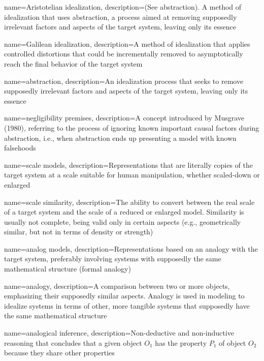 {
    name=Aristotelian idealization,
    description={(See abstraction). A method of idealization that uses abstraction, a process aimed at removing supposedly irrelevant factors and aspects of the target system, leaving only its essence}
}

{
    name=Galilean idealization,
    description={A method of idealization that applies controlled distortions that could be incrementally removed to asymptotically reach the final behavior of the target system}
}

{
    name=abstraction,
    description={An idealization process that seeks to remove supposedly irrelevant factors and aspects of the target system, leaving only its essence}
}

{
    name=negligibility premises,
    description={A concept introduced by Musgrave (1980), referring to the process of ignoring known important causal factors during abstraction, i.e., when abstraction ends up presenting a model with known falsehoods}
}

{
    name=scale models,
    description={Representations that are literally copies of the target system at a scale suitable for human manipulation, whether scaled-down or enlarged}
}

{
    name=scale similarity,
    description={The ability to convert between the real scale of a target system and the scale of a reduced or enlarged model. Similarity is usually not complete, being valid only in certain aspects (e.g., geometrically similar, but not in terms of density or strength)}
}

{
    name=analog models,
    description={Representations based on an analogy with the target system, preferably involving systems with supposedly the same mathematical structure (formal analogy)}
}

{
    name=analogy,
    description={A comparison between two or more objects, emphasizing their supposedly similar aspects. Analogy is used in modeling to idealize systems in terms of other, more tangible systems that supposedly have the same mathematical structure}
}

{
    name=analogical inference,
    description={Non-deductive and non-inductive reasoning that concludes that a given object $O_1$ has the property $P_1$ of object $O_2$ because they share other properties}
}

